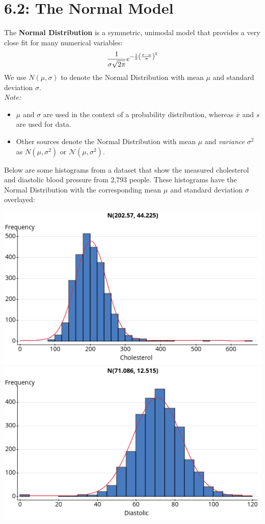 \documentclass[../mathNotesPreamble]{subfiles}
\begin{document}
  \section{6.2: The Normal Model}
    \begin{defn*}
      The \textbf{Normal Distribution} is a symmetric, unimodal model that provides a very close fit for many numerical variables:
      \[\frac{1}{\sigma\sqrt{2\pi}} e^{-\frac{1}{2}{\left(\frac{x-\mu}{\sigma}\right)}^2}\]
      We use $N(\mu,\sigma)$ to denote the Normal Distribution with mean $\mu$ and standard deviation $\sigma$. \\
      \emph{Note:}
        \begin{itemize}
          \item $\mu$ and $\sigma$ are used in the context of a probability distribution, whereas $\overline{x}$ and $s$ are used for data.
          \item Other sources denote the Normal Distribution with mean $\mu$ and \emph{variance} $\sigma^2$ as $N(\mu,\sigma^2)$ or $\mathcal{N}(\mu,\sigma^2)$.
        \end{itemize}
    \end{defn*}

    \begin{ex*}
      Below are some histograms from a dataset that show the measured cholesterol and diastolic blood pressure from 2,793 people. These histograms have the Normal Distribution with the corresponding mean $\mu$ and standard deviation $\sigma$ overlayed:
    \end{ex*}
    \begin{center}
      \includegraphics[width=0.49\linewidth]{images/math211_figure_6p9a}
      \includegraphics[width=0.49\linewidth]{images/math211_figure_6p9b}%
%
%
    \end{center}
    \pagebreak
\end{document}
